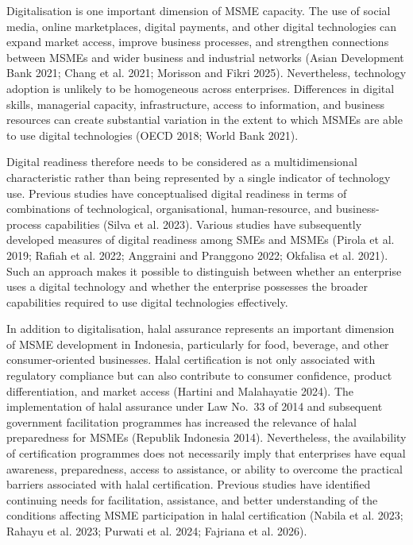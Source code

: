 \documentclass[
  default,
]{sn-jnl}
\begin{document}
Digitalisation is one important dimension of MSME capacity. The use of
social media, online marketplaces, digital payments, and other digital
technologies can expand market access, improve business processes, and
strengthen connections between MSMEs and wider business and industrial
networks (Asian Development Bank 2021; Chang et al. 2021; Morisson and
Fikri 2025). Nevertheless, technology adoption is unlikely to be
homogeneous across enterprises. Differences in digital skills,
managerial capacity, infrastructure, access to information, and business
resources can create substantial variation in the extent to which MSMEs
are able to use digital technologies (OECD 2018; World Bank 2021).

Digital readiness therefore needs to be considered as a multidimensional
characteristic rather than being represented by a single indicator of
technology use. Previous studies have conceptualised digital readiness
in terms of combinations of technological, organisational,
human-resource, and business-process capabilities (Silva et al. 2023).
Various studies have subsequently developed measures of digital
readiness among SMEs and MSMEs (Pirola et al. 2019; Rafiah et al. 2022;
Anggraini and Pranggono 2022; Okfalisa et al. 2021). Such an approach
makes it possible to distinguish between whether an enterprise uses a
digital technology and whether the enterprise possesses the broader
capabilities required to use digital technologies effectively.

In addition to digitalisation, halal assurance represents an important
dimension of MSME development in Indonesia, particularly for food,
beverage, and other consumer-oriented businesses. Halal certification is
not only associated with regulatory compliance but can also contribute
to consumer confidence, product differentiation, and market access
(Hartini and Malahayatie 2024). The implementation of halal assurance
under Law No.~33 of 2014 and subsequent government facilitation
programmes has increased the relevance of halal preparedness for MSMEs
(Republik Indonesia 2014). Nevertheless, the availability of
certification programmes does not necessarily imply that enterprises
have equal awareness, preparedness, access to assistance, or ability to
overcome the practical barriers associated with halal certification.
Previous studies have identified continuing needs for facilitation,
assistance, and better understanding of the conditions affecting MSME
participation in halal certification (Nabila et al. 2023; Rahayu et al.
2023; Purwati et al. 2024; Fajriana et al. 2026).
\end{document}
